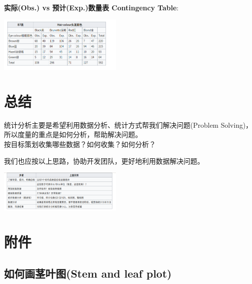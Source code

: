 \textbf{实际(Obs.) vs 预计(Exp.)数量表 Contingency Table}:

\includegraphics[width=6cm]{Screenshotfrom2023-11-0920-21-37.png}

\begin{description}
\item[]
\end{description}

\hypertarget{ux603bux7ed3}{%
\section{总结}\label{ux603bux7ed3}}

统计分析主要是希望利用数据分析、统计方式帮我们解决问题(Problem
Solving)，所以度量的重点是如何分析，帮助解决问题。\\
按目标策划收集哪些数据？如何收集？如何分析？

我们也应按以上思路，协助开发团队，更好地利用数据解决问题。

\includegraphics[width=6cm]{Screenshotfrom2023-11-0920-22-37.png}

\hypertarget{ux9644ux4ef6}{%
\section{附件}\label{ux9644ux4ef6}}

\hypertarget{ux5982ux4f55ux753bux830eux53f6ux56festem-and-leaf-plot}{%
\subsection{如何画茎叶图(Stem and leaf
plot)}\label{ux5982ux4f55ux753bux830eux53f6ux56festem-and-leaf-plot}}

